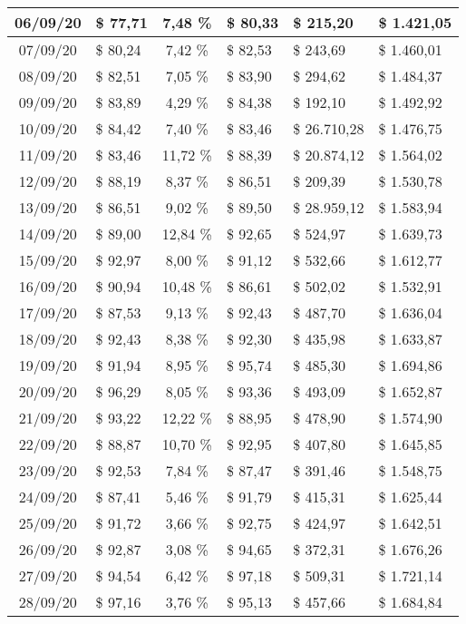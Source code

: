 \begin{center}
\begin{small}
\begin{longtable}{|c|l|c|l|l|l|}
06/09/20 & \$ 77,71 & 7,48 \% & \$ 80,33 & \$ 215,20 & \$ 1.421,05 \\ \hline
07/09/20 & \$ 80,24 & 7,42 \% & \$ 82,53 & \$ 243,69 & \$ 1.460,01 \\ \hline
08/09/20 & \$ 82,51 & 7,05 \% & \$ 83,90 & \$ 294,62 & \$ 1.484,37 \\ \hline
09/09/20 & \$ 83,89 & 4,29 \% & \$ 84,38 & \$ 192,10 & \$ 1.492,92 \\ \hline
10/09/20 & \$ 84,42 & 7,40 \% & \$ 83,46 & \$ 26.710,28 & \$ 1.476,75 \\ \hline
11/09/20 & \$ 83,46 & 11,72 \% & \$ 88,39 & \$ 20.874,12 & \$ 1.564,02 \\ \hline
12/09/20 & \$ 88,19 & 8,37 \% & \$ 86,51 & \$ 209,39 & \$ 1.530,78 \\ \hline
13/09/20 & \$ 86,51 & 9,02 \% & \$ 89,50 & \$ 28.959,12 & \$ 1.583,94 \\ \hline
14/09/20 & \$ 89,00 & 12,84 \% & \$ 92,65 & \$ 524,97 & \$ 1.639,73 \\ \hline
15/09/20 & \$ 92,97 & 8,00 \% & \$ 91,12 & \$ 532,66 & \$ 1.612,77 \\ \hline
16/09/20 & \$ 90,94 & 10,48 \% & \$ 86,61 & \$ 502,02 & \$ 1.532,91 \\ \hline
17/09/20 & \$ 87,53 & 9,13 \% & \$ 92,43 & \$ 487,70 & \$ 1.636,04 \\ \hline
18/09/20 & \$ 92,43 & 8,38 \% & \$ 92,30 & \$ 435,98 & \$ 1.633,87 \\ \hline
19/09/20 & \$ 91,94 & 8,95 \% & \$ 95,74 & \$ 485,30 & \$ 1.694,86 \\ \hline
20/09/20 & \$ 96,29 & 8,05 \% & \$ 93,36 & \$ 493,09 & \$ 1.652,87 \\ \hline
21/09/20 & \$ 93,22 & 12,22 \% & \$ 88,95 & \$ 478,90 & \$ 1.574,90 \\ \hline
22/09/20 & \$ 88,87 & 10,70 \% & \$ 92,95 & \$ 407,80 & \$ 1.645,85 \\ \hline
23/09/20 & \$ 92,53 & 7,84 \% & \$ 87,47 & \$ 391,46 & \$ 1.548,75 \\ \hline
24/09/20 & \$ 87,41 & 5,46 \% & \$ 91,79 & \$ 415,31 & \$ 1.625,44 \\ \hline
25/09/20 & \$ 91,72 & 3,66 \% & \$ 92,75 & \$ 424,97 & \$ 1.642,51 \\ \hline
26/09/20 & \$ 92,87 & 3,08 \% & \$ 94,65 & \$ 372,31 & \$ 1.676,26 \\ \hline
27/09/20 & \$ 94,54 & 6,42 \% & \$ 97,18 & \$ 509,31 & \$ 1.721,14 \\ \hline
28/09/20 & \$ 97,16 & 3,76 \% & \$ 95,13 & \$ 457,66 & \$ 1.684,84 \\ \hline

\end{longtable}
\end{small}
\end{center}

